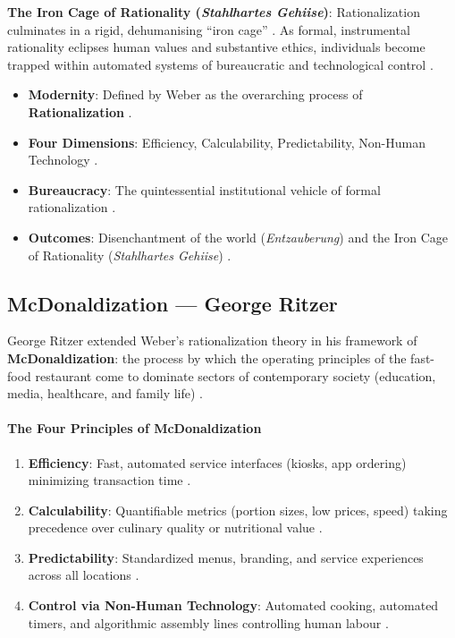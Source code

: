 \begin{CriticalPoint}
\textbf{The Iron Cage of Rationality (\textit{Stahlhartes Gehiise})}:
Rationalization culminates in a rigid, dehumanising ``iron cage'' . As formal, instrumental rationality eclipses human values and substantive ethics, individuals become trapped within automated systems of bureaucratic and technological control .
\end{CriticalPoint}

\begin{QuickRevision}
\begin{itemize}
    \item \textbf{Modernity}: Defined by Weber as the overarching process of \textbf{Rationalization} .
    \item \textbf{Four Dimensions}: Efficiency, Calculability, Predictability, Non-Human Technology .
    \item \textbf{Bureaucracy}: The quintessential institutional vehicle of formal rationalization .
    \item \textbf{Outcomes}: Disenchantment of the world (\textit{Entzauberung}) and the Iron Cage of Rationality (\textit{Stahlhartes Gehiise}) .
\end{itemize}
\end{QuickRevision}

\subsection{McDonaldization --- George Ritzer}

George Ritzer extended Weber's rationalization theory in his framework of \textbf{McDonaldization}: the process by which the operating principles of the fast-food restaurant come to dominate sectors of contemporary society (education, media, healthcare, and family life) .

\paragraph{The Four Principles of McDonaldization}
\begin{enumerate}
    \item \textbf{Efficiency}: Fast, automated service interfaces (kiosks, app ordering) minimizing transaction time .
    \item \textbf{Calculability}: Quantifiable metrics (portion sizes, low prices, speed) taking precedence over culinary quality or nutritional value .
    \item \textbf{Predictability}: Standardized menus, branding, and service experiences across all locations .
    \item \textbf{Control via Non-Human Technology}: Automated cooking, automated timers, and algorithmic assembly lines controlling human labour .
\end{enumerate}

